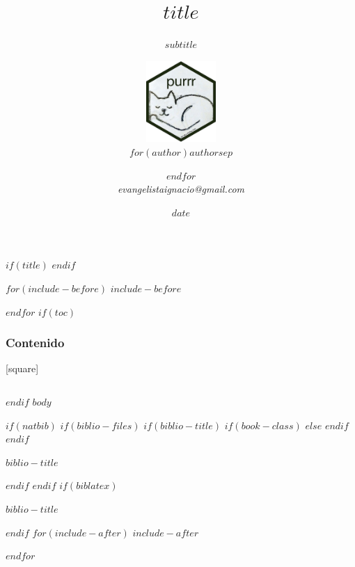 \documentclass[$if(fontsize)$$fontsize$,$endif$$if(handout)$handout,$endif$$if(beamer)$ignorenonframetext,$endif$$for(classoption)$$classoption$$sep$,$endfor$]{$documentclass$}
\title{$title$}
\subtitle{$subtitle$}
\author{\includegraphics[width=0.2\textwidth]{purrr.jpg}\\ $for(author)$$author$$sep$ \and $endfor$\\
\institute[A]{
Grupo de Usuaries de R en Rosario
}
\textit{evangelistaignacio@gmail.com}}
\date{$date$}
\begin{document}
	$if(title)$
	\frame{\titlepage}
	$endif$
	
	$for(include-before)$
	$include-before$
	
	$endfor$
	$if(toc)$
\begin{frame}
\frametitle{Contenido} %
[square]
\begin{columns}[t]
		\tableofcontents[sections={1-3}]
		\tableofcontents[sections={4-8}]
\end{columns}
\end{frame}

$endif$
$body$

$if(natbib)$
$if(biblio-files)$
$if(biblio-title)$
$if(book-class)$
\renewcommand\bibname{$biblio-title$}
$else$
\renewcommand\refname{$biblio-title$}
$endif$
$endif$
\begin{frame}[allowframebreaks]{$biblio-title$}

\end{frame}

$endif$
$endif$
$if(biblatex)$
\begin{frame}[allowframebreaks]{$biblio-title$}
\printbibliography[heading=none]
\end{frame}

$endif$
$for(include-after)$
$include-after$

$endfor$
\end{document}
